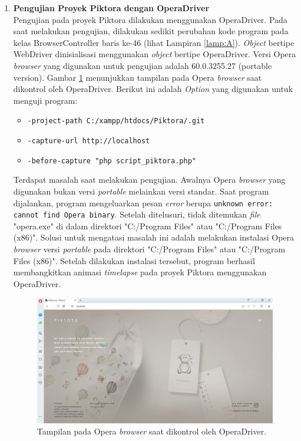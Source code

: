 \begin{enumerate}
\item \textbf{Pengujian Proyek Piktora dengan OperaDriver}\\
Pengujian pada proyek Piktora dilakukan menggunakan OperaDriver. Pada saat melakukan pengujian, dilakukan sedikit perubahan kode program pada kelas BrowserController baris ke-46 (lihat Lampiran \ref{lamp:A}). \textit{Object} bertipe WebDriver dinisialisasi menggunakan \textit{object} bertipe OperaDriver. Versi Opera \textit{browser} yang digunakan untuk pengujian adalah 60.0.3255.27 (portable version). Gambar \ref{fig:opera} menunjukkan tampilan pada Opera \textit{browser} saat dikontrol oleh OperaDriver. Berikut ini adalah \textit{Option} yang digunakan untuk menguji program:
\begin{itemize}
\item \texttt{-project-path C:/xampp/htdocs/Piktora/.git}
\item \texttt{-capture-url http://localhost}
\item \texttt{-before-capture "php script\_piktora.php"}
\end{itemize}

Terdapat masalah saat melakukan pengujian. Awalnya Opera \textit{browser} yang digunakan bukan versi \textit{portable} melainkan versi standar. Saat program dijalankan, program mengeluarkan pesan \textit{error} berupa \texttt{unknown error: cannot find Opera binary}. Setelah ditelusuri, tidak ditemukan \textit{file} "opera.exe" di dalam direktori "C:/Program Files" atau "C:/Program Files (x86)". Solusi untuk mengatasi masalah ini adalah melakukan instalasi Opera \textit{browser} versi \textit{portable} pada direktori "C:/Program Files" atau "C:/Program Files (x86)". Setelah dilakukan instalasi tersebut, program berhasil membangkitkan animasi \textit{timelapse} pada proyek Piktora menggunakan OperaDriver. 

\begin{figure}[H]
	\centering
		\includegraphics[scale=0.4]{Gambar/Opera.png}
	\caption{Tampilan pada Opera \textit{browser} saat dikontrol oleh OperaDriver.}
	\label{fig:opera}
\end{figure}



\end{enumerate}

